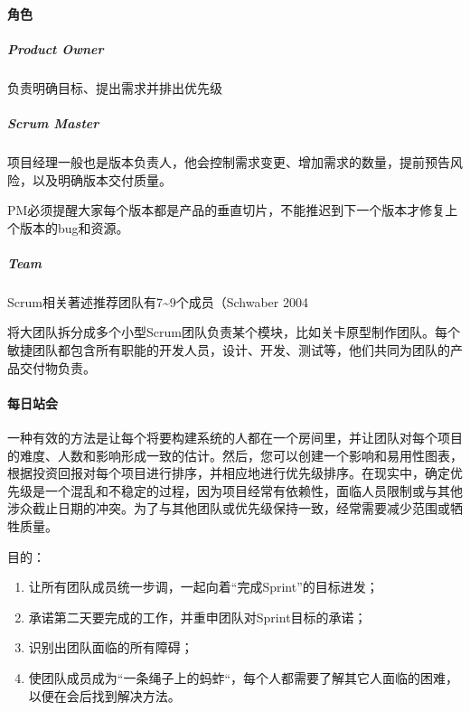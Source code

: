 \documentclass[letterpaper,10pt,english]{sphinxmanual}
\begin{document}
\paragraph{角色}
\label{\detokenize{chapter_project/Scrum:id8}}

\subparagraph{Product Owner}
\label{\detokenize{chapter_project/Scrum:product-owner}}
负责明确目标、提出需求并排出优先级


\subparagraph{Scrum Master}
\label{\detokenize{chapter_project/Scrum:scrum-master}}
项目经理一般也是版本负责人，他会控制需求变更、增加需求的数量，提前预告风险，以及明确版本交付质量。

PM必须提醒大家每个版本都是产品的垂直切片，不能推迟到下一个版本才修复上个版本的bug和资源。


\subparagraph{Team}
\label{\detokenize{chapter_project/Scrum:team}}
Scrum相关著述推荐团队有7\textasciitilde{}9个成员（Schwaber 2004

将大团队拆分成多个小型Scrum团队负责某个模块，比如关卡原型制作团队。每个敏捷团队都包含所有职能的开发人员，设计、开发、测试等，他们共同为团队的产品交付物负责。


\paragraph{每日站会}
\label{\detokenize{chapter_project/Scrum:id9}}
一种有效的方法是让每个将要构建系统的人都在一个房间里，并让团队对每个项目的难度、人数和影响形成一致的估计。然后，您可以创建一个影响和易用性图表，根据投资回报对每个项目进行排序，并相应地进行优先级排序。在现实中，确定优先级是一个混乱和不稳定的过程，因为项目经常有依赖性，面临人员限制或与其他涉众截止日期的冲突。为了与其他团队或优先级保持一致，经常需要减少范围或牺牲质量。

目的：
\begin{enumerate}
%
\item {} 
让所有团队成员统一步调，一起向着“完成Sprint”的目标进发；

\item {} 
承诺第二天要完成的工作，并重申团队对Sprint目标的承诺；

\item {} 
识别出团队面临的所有障碍；

\item {} 
使团队成员成为“一条绳子上的蚂蚱“，每个人都需要了解其它人面临的困难，以便在会后找到解决方法。

\end{enumerate}
\end{document}
